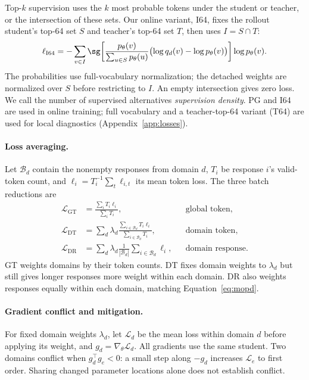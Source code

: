 Top-$k$ supervision uses the $k$ most probable tokens under the student or teacher, or the intersection of these sets. Our online variant, I64, fixes the rollout student's top-64 set $S$ and teacher's top-64 set $T$, then uses $I=S\cap T$:
\begin{equation}
\ell_{\mathrm{I64}}=-\sum_{v\in I}\sg\!\left[
\frac{p_\theta(v)}{\sum_{u\in S}p_\theta(u)}
\bigl(\log q_d(v)-\log p_\theta(v)\bigr)\right]\log p_\theta(v).
\label{eq:i64}
\end{equation}
The probabilities use full-vocabulary normalization; the detached weights are normalized over $S$ before restricting to $I$. An empty intersection gives zero loss. We call the number of supervised alternatives \emph{supervision density}. PG and I64 are used in online training; full vocabulary and a teacher-top-64 variant (T64) are used for local diagnostics (Appendix~\ref{app:losses}).

\paragraph{Loss averaging.}
Let $\mathcal B_d$ contain the nonempty responses from domain $d$, $T_i$ be response $i$'s valid-token count, and $\ell_i=T_i^{-1}\sum_t\ell_{i,t}$ its mean token loss. The three batch reductions are
\begin{equation}
\begin{aligned}
\mathcal L_{\mathrm{GT}}&=\frac{\sum_iT_i\ell_i}{\sum_iT_i},
&&\text{global token},\\
\mathcal L_{\mathrm{DT}}&=\sum_d\lambda_d\frac{\sum_{i\in\mathcal B_d}T_i\ell_i}{\sum_{i\in\mathcal B_d}T_i},
&&\text{domain token},\\
\mathcal L_{\mathrm{DR}}&=\sum_d\lambda_d\frac{1}{|\mathcal B_d|}\sum_{i\in\mathcal B_d}\ell_i,
&&\text{domain response}.
\end{aligned}
\label{eq:averaging}
\end{equation}
GT weights domains by their token counts. DT fixes domain weights to $\lambda_d$ but still gives longer responses more weight within each domain. DR also weights responses equally within each domain, matching Equation~\ref{eq:mopd}.

\paragraph{Gradient conflict and mitigation.}
For fixed domain weights $\lambda_d$, let $\mathcal L_d$ be the mean loss within domain $d$ before applying its weight, and $g_d=\nabla_\theta\mathcal L_d$. All gradients use the same student. Two domains conflict when $g_d^\top g_e<0$: a small step along $-g_d$ increases $\mathcal L_e$ to first order. Sharing changed parameter locations alone does not establish conflict.

